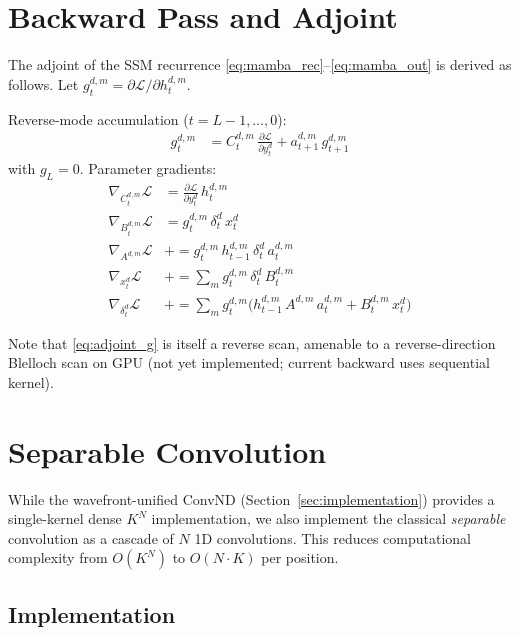 \documentclass[10pt,onecolumn]{article}
\begin{document}
\section{Backward Pass and Adjoint}
\label{sec:backward}

The adjoint of the SSM recurrence \eqref{eq:mamba_rec}--\eqref{eq:mamba_out}
is derived as follows. Let $g_t^{d,m} = \partial \mathcal{L}/\partial h_t^{d,m}$.

Reverse-mode accumulation ($t = L{-}1, \ldots, 0$):
\begin{align}
  g_t^{d,m} &= C_t^{d,m}\,\frac{\partial\mathcal{L}}{\partial y_t^d}
             + a_{t+1}^{d,m}\,g_{t+1}^{d,m} \label{eq:adjoint_g}
\end{align}
with $g_L = 0$. Parameter gradients:
\begin{align}
  \nabla_{C_t^{d,m}}\mathcal{L} &= \frac{\partial\mathcal{L}}{\partial y_t^d}\,h_t^{d,m} \\
  \nabla_{B_t^{d,m}}\mathcal{L} &= g_t^{d,m}\,\delta_t^d\,x_t^d \\
  \nabla_{A^{d,m}}\mathcal{L}   &+= g_t^{d,m}\,h_{t-1}^{d,m}\,\delta_t^d\,a_t^{d,m} \\
  \nabla_{x_t^d}\mathcal{L}     &+= \sum_m g_t^{d,m}\,\delta_t^d\,B_t^{d,m} \\
  \nabla_{\delta_t^d}\mathcal{L} &+= \sum_m g_t^{d,m}
        \bigl(h_{t-1}^{d,m}\,A^{d,m}\,a_t^{d,m} + B_t^{d,m}\,x_t^d\bigr)
\end{align}

Note that \eqref{eq:adjoint_g} is itself a reverse scan, amenable to
a reverse-direction Blelloch scan on GPU (not yet implemented;
current backward uses sequential kernel).

\section{Separable Convolution}
\label{sec:separable}

While the wavefront-unified ConvND (Section~\ref{sec:implementation}) provides
a single-kernel dense $K^N$ implementation, we also implement the
classical \emph{separable} convolution as a cascade of $N$ 1D convolutions.
This reduces computational complexity from $O(K^N)$ to $O(N \cdot K)$ per position.

\subsection{Implementation}
\end{document}

